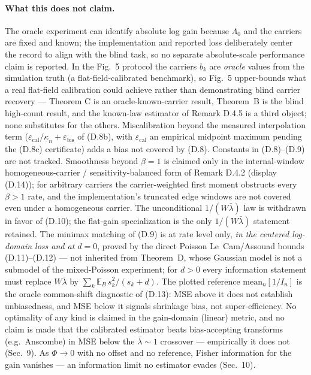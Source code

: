 \paragraph{What this does not claim.} The oracle experiment can identify absolute log gain because $\Lambda_0$ and the carriers are fixed and known; the implementation and reported loss deliberately center the record to align with the blind task, so no separate absolute-scale performance claim is reported. In the Fig.~5 protocol the carriers $b_k$ are \emph{oracle} values from the simulation truth (a flat-field-calibrated benchmark), so Fig.~5 upper-bounds what a real flat-field calibration could achieve rather than demonstrating blind carrier recovery --- Theorem C is an oracle-known-carrier result, Theorem~B is the blind high-count result, and the known-law estimator of Remark D.4.5 is a third object; none substitutes for the others. Miscalibration beyond the measured interpolation term ($\varepsilon_{\mathrm{cal}}/\underline\kappa_n+\varepsilon_{\mathrm{bis}}$ of (D.8b), with $\varepsilon_{\mathrm{cal}}$ an empirical midpoint maximum pending the (D.8c) certificate) adds a bias not covered by (D.8). Constants in (D.8)--(D.9) are not tracked. Smoothness beyond $\beta=1$ is claimed only in the internal-window homogeneous-carrier / sensitivity-balanced form of Remark D.4.2 (display (D.14)); for arbitrary carriers the carrier-weighted first moment obstructs every $\beta>1$ rate, and the implementation's truncated edge windows are not covered even under a homogeneous carrier. The unconditional $1/(W\bar\lambda)$ law is withdrawn in favor of (D.10); the flat-gain specialization is the only $1/(W\bar\lambda)$ statement retained. The minimax matching of (D.9) is at rate level only, \emph{in the centered log-domain loss and at $d=0$}, proved by the direct Poisson Le~Cam/Assouad bounds (D.11)--(D.12) --- not inherited from Theorem~D, whose Gaussian model is not a submodel of the mixed-Poisson experiment; for $d>0$ every information statement must replace $W\bar\lambda$ by $\sum_k\mathbb{E}_B\,s_k^2/(s_k+d)$. The plotted reference $\mathrm{mean}_n[1/I_n]$ is the oracle common-shift diagnostic of (D.13): MSE above it does not establish unbiasedness, and MSE below it signals shrinkage bias, not super-efficiency. No optimality of any kind is claimed in the gain-domain (linear) metric, and no claim is made that the calibrated estimator beats bias-accepting transforms (e.g.\ Anscombe) in MSE below the $\bar\lambda\sim1$ crossover --- empirically it does not (Sec.~9). As $\Phi\to0$ with no offset and no reference, Fisher information for the gain vanishes --- an information limit no estimator evades (Sec.~10).

